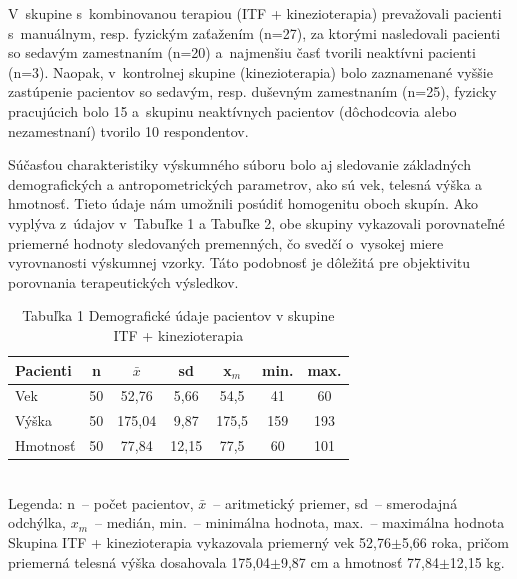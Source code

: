 V~skupine s~kombinovanou terapiou (ITF + kinezioterapia) prevažovali pacienti s~manuálnym, resp. fyzickým zaťažením (n=27), za ktorými nasledovali pacienti so sedavým zamestnaním (n=20) a~najmenšiu časť tvorili neaktívni pacienti (n=3). Naopak, v~kontrolnej skupine (kinezioterapia) bolo zaznamenané vyššie zastúpenie pacientov so sedavým, resp. duševným zamestnaním (n=25), fyzicky pracujúcich bolo 15 a~skupinu neaktívnych pacientov (dôchodcovia alebo nezamestnaní) tvorilo 10 respondentov.

Súčasťou charakteristiky výskumného súboru bolo aj sledovanie základných demografických a antropometrických parametrov, ako sú vek, telesná výška a hmotnosť. Tieto údaje nám umožnili posúdiť homogenitu oboch skupín. Ako vyplýva z~údajov v~Tabuľke 1 a Tabuľke 2, obe skupiny vykazovali porovnateľné priemerné hodnoty sledovaných premenných, čo svedčí o~vysokej miere vyrovnanosti výskumnej vzorky. Táto podobnosť je dôležitá pre objektivitu porovnania terapeutických výsledkov.

\begin{table}[H]
\centering
\caption*{Tabuľka 1 Demografické údaje pacientov v skupine ITF + kinezioterapia}
\begin{tabular}{|l|c|c|c|c|c|c|}
\hline
\textbf{Pacienti} & \textbf{n} & \textbf{$\bar{x}$} & \textbf{sd} & \textbf{x$_m$} & \textbf{min.} & \textbf{max.} \\ \hline
Vek & 50 & 52,76 & 5,66 & 54,5 & 41 & 60 \\ \hline
Výška & 50 & 175,04 & 9,87 & 175,5 & 159 & 193 \\ \hline
Hmotnosť & 50 & 77,84 & 12,15 & 77,5 & 60 & 101 \\ \hline
\end{tabular}
\\
\footnotesize{Legenda: n~-- počet pacientov, $\bar{x}$~-- aritmetický priemer, sd~-- smerodajná odchýlka, $x_m$~-- medián, min.~-- minimálna hodnota, max.~-- maximálna hodnota}
\vspace{0.5em}
\newline
Skupina ITF + kinezioterapia vykazovala priemerný vek 52,76$\pm$5,66 roka, pričom priemerná telesná výška dosahovala 175,04$\pm$9,87 cm a hmotnosť 77,84$\pm$12,15 kg.
\label{tab:demografia_itf}
\end{table}

